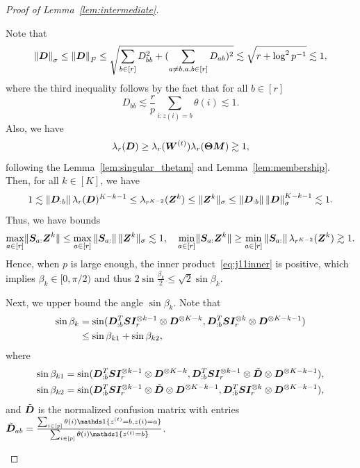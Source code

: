 \documentclass[lettersize,onecolumn,journal]{IEEEtran}
\theoremstyle{definition}
\theoremstyle{definition}
\begin{document}
\begin{proof}[Proof of Lemma~\ref{lem:intermediate}]
\begin{enumerate}
    Note that 
    \begin{equation}\label{eq:singular_Du}
        \onorm{\mD}_{\sigma} \leq \onorm{\mD}_{F} \leq  \sqrt{\sum_{b \in [r]} D_{bb}^2 + (\sum_{a \neq b, a ,b \in [r]} D_{ab} )^2} \lesssim \sqrt{r  + \log^2 p^{-1}} \lesssim 1,
    \end{equation}
    where the third inequality follows by the fact that for all $b \in [r]$ 
    \begin{equation}
        D_{bb} \lesssim \frac{r}{p} \sum_{i\colon z(i) = b} \theta(i) \lesssim 1.
    \end{equation}
    Also, we have 
    \begin{equation}\label{eq:singular_Dl}
        \lambda_r(\mD) \geq \lambda_r(\mW^{(t)}) \lambda_r(\mTheta \mM) \gtrsim 1,
    \end{equation}
    following the Lemma~\ref{lem:singular_thetam} and Lemma~\ref{lem:membership}. Then, for all $k \in [K]$, we have 
    \begin{equation}\label{eq:singular_z}
       1 \lesssim \onorm{\mD_{:b}} \lambda_r(\mD)^{K-k-1}  \leq \lambda_{r^{K-2}}(\mZ^{k}) \leq \onormSize{}{\mZ^k}_{\sigma} \leq \onorm{\mD_{:b}} \onorm{\mD}_{\sigma}^{K-k-1} \lesssim 1.
    \end{equation}
    Thus, we have bounds 
    \begin{equation}
         \max_{a \in [r]} \lVert\bm S_{a:} \bm Z^k\rVert \leq \max_{a \in [r]} \left\lVert\bm S_{a:}\right\rVert \lVert\bm Z^k\rVert_{\sigma} \lesssim 1, \quad \min_{a \in [r]} \lVert\bm S_{a:}\bm Z^k\rVert  \geq \min_{a \in [r]} \left\lVert\bm S_{a:}\right\rVert \lambda_{r^{K-2}}(\bm Z^{k}) \gtrsim 1.
    \end{equation}
    Hence, when $p$ is large enough, the inner product~\eqref{eq:j11inner} is positive, which implies $\beta_k \in [0, \pi/2)$ and thus $2 \sin \frac{\beta_k}{2} \leq \sqrt{2} \sin \beta_k$.
    
    Next, we upper bound the angle $\sin \beta_k$. Note that
    \begin{align}
         \sin \beta_k &= \sin ({\bm{D}_{:b}^{T} \bm S \bm I_r^{\otimes k-1} \otimes \bm{D}^{\otimes K-k} }, {\bm{D}_{:b}^{T} \bm S \bm I_r^{\otimes k} \otimes \bm{D}^{\otimes K-k-1} } )\\
         &\leq \sin \beta_{k1} + \sin \beta_{k2},
    \end{align}
    where
    \begin{align}
         \sin \beta_{k1} &= \sin ({\bm{D}_{:b}^{T} \bm S \bm I_r^{\otimes k-1} \otimes \bm{D}^{\otimes K-k} }, {\bm{D}_{:b}^{T} \bm S \bm I_r^{\otimes k-1} \otimes \tilde {\bm{D}} \otimes \bm{D}^{\otimes K-k-1} } ),\\
         \sin \beta_{k2} & = \sin ({\bm{D}_{:b}^{T} \bm S \bm I_r^{\otimes k-1} \otimes \tilde {\bm{D}} \otimes \bm{D}^{\otimes K-k-1} } , {\bm{D}_{:b}^{T} \bm S \bm I_r^{\otimes k} \otimes \bm{D}^{\otimes K-k-1} }   ),
    \end{align}
    and $\tilde {\bm{D}}$ is the normalized confusion matrix with entries $\tilde \mD_{ab} = \frac{\sum_{i \in [p]} \theta(i) \ind\{z^{(t)} = b, z(i) = a\}}{\sum_{i \in [p] }\theta(i) \ind\{z^{(t)} = b\}}$.
    

\end{enumerate}
\end{proof}
\end{document}
